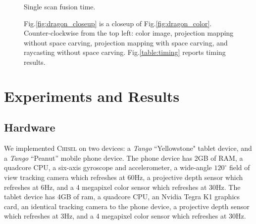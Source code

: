 \documentclass[conference]{IEEEtran}
\newcommand{\figref}[1]{Fig.\ref{#1}}
\newcommand{\Tango}{\textit{Tango} }
\newcommand{\chisel}{\textsc{Chisel}\xspace}
\begin{document}
\begin{figure} [htb]
\begin{subtable}[b]{0.4\linewidth}
			\caption{Single scan fusion time.}
			\label{table:timing}
	 \end{subtable} 
	 \caption{\figref{fig:dragon_closeup} is a closeup of
	 \figref{fig:dragon_color}.
	 Counter-clockwise from the top left: color image, projection mapping without
	 space carving, projection mapping with space carving, and raycasting without
	 space carving. \figref{table:timing} reports timing results.}
	 \label{fig:device_data}
 \end{figure} 

\section{Experiments and Results}
\label{section:experiments}
\subsection{Hardware}
\label{section:hardware}
We implemented \chisel on two devices: a \Tango
``Yellowstone" tablet device, and a \Tango ``Peanut'' mobile 
phone device. The phone device has 2GB of RAM, a quadcore
CPU, a six-axis gyroscope and accelerometer, a wide-angle $120^\circ$ field of
view tracking camera which refreshes at 60Hz, a projective depth sensor which
refreshes at 6Hz, and a 4 megapixel color sensor which refreshes at 30Hz. The
tablet device has 4GB of ram, a quadcore CPU, an Nvidia Tegra K1 graphics card,
an identical tracking camera to the phone device, a projective depth sensor
which refreshes at 3Hz, and a 4 megapixel color sensor which refreshes at 30Hz.
\end{document}
